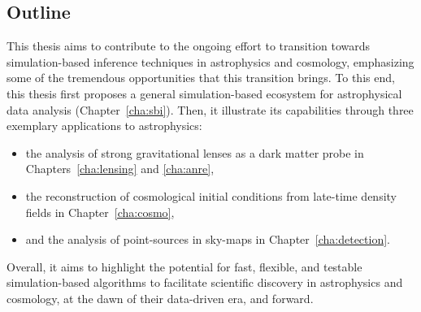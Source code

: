 \subsection*{Outline}
This thesis aims to contribute to the ongoing effort to transition towards simulation-based inference techniques in astrophysics and cosmology, emphasizing some of the tremendous opportunities that this transition brings. To this end, this thesis first proposes a general simulation-based ecosystem for astrophysical data analysis (Chapter~\ref{cha:sbi}). Then, it illustrate its capabilities through three exemplary applications to astrophysics: 
\begin{itemize}[leftmargin=1cm]
	\item the analysis of strong gravitational lenses as a dark matter probe in Chapters~\ref{cha:lensing} and \ref{cha:anre}, 
	\item the reconstruction of cosmological initial conditions from late-time density fields in Chapter~\ref{cha:cosmo}, 
	\item and the analysis of point-sources in sky-maps in Chapter~\ref{cha:detection}. 
\end{itemize}
Overall, it aims to highlight the potential for fast, flexible, and testable simulation-based algorithms to facilitate scientific discovery in astrophysics and cosmology, at the dawn of their data-driven era, and forward.




